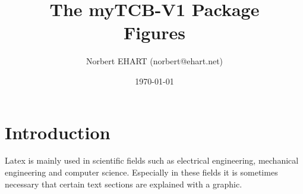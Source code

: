 \documentclass[]{myHOWTO-V001}
\title{The \textbf{myTCB-V1} Package\\{\small Figures}}
\author{Norbert EHART (norbert@ehart.net)}
\date{\today}
\begin{document}
	
%
%


%
%

\maketitle

%
%

\tableofcontents

%
%

\section{Introduction}

Latex is mainly used in scientific fields such as electrical engineering, mechanical engineering and computer science. Especially in these fields it is sometimes necessary that certain text sections are explained with a graphic.
\end{document}
